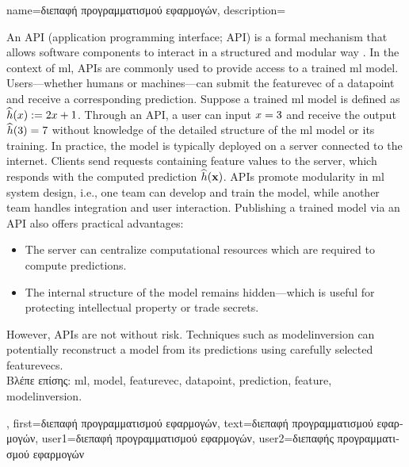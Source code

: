 {name={\foreignlanguage{greek}{διεπαφή προγραμματισμού εφαρμογών}},
		description={An 
			API (application programming interface; API) is a formal mechanism that 
			allows software components to interact in a structured and modular way \cite{RestfulBook2013}.
			In the context of \gls{ml}, APIs are commonly used to provide access to a trained \gls{ml} \gls{model}. 
			Users—whether humans or machines—can submit the \gls{featurevec} of a \gls{datapoint} and receive 
			a corresponding \gls{prediction}. Suppose a trained \gls{ml} \gls{model} is defined 
			as $\widehat{h}(x) := 2 x + 1$. Through an API, a user 
			can input $x = 3$ and receive the output $\widehat{h}(3) = 7$ 
			without knowledge of the detailed structure of the \gls{ml} \gls{model} or its training. 
			In practice, the \gls{model} is typically deployed on a server connected to the internet. 
			Clients send requests containing \gls{feature} values to the server, which responds with 
			the computed \gls{prediction} $\widehat{h}({\bf x})$. APIs promote modularity 
			in \gls{ml} system design, i.e., one team can develop and train the \gls{model}, while another team
			handles integration and user interaction. Publishing a trained \gls{model} via an API also 
			offers practical advantages: 
			\begin{itemize} 
				\item The server can centralize computational resources which are required to compute \gls{prediction}s. 
		        		\item The internal structure of the \gls{model} remains hidden—which is useful for protecting intellectual property or trade secrets. 
		    	\end{itemize} 
			However, APIs are not without \gls{risk}. Techniques such as \gls{modelinversion} can potentially reconstruct a 
			\gls{model} from its \gls{prediction}s using carefully selected \gls{featurevec}s.\\
			\foreignlanguage{greek}{Βλέπε επίσης:} \gls{ml}, \gls{model}, \gls{featurevec}, \gls{datapoint}, \gls{prediction}, \gls{feature}, \gls{modelinversion}.},
		first={\foreignlanguage{greek}{διεπαφή προγραμματισμού εφαρμογών}},
		text={\foreignlanguage{greek}{διεπαφή προγραμματισμού εφαρμογών}},
		user1={\foreignlanguage{greek}{διεπαφή προγραμματισμού εφαρμογών}}, %
		user2={\foreignlanguage{greek}{διεπαφής προγραμματισμού εφαρμογών}} %
}

